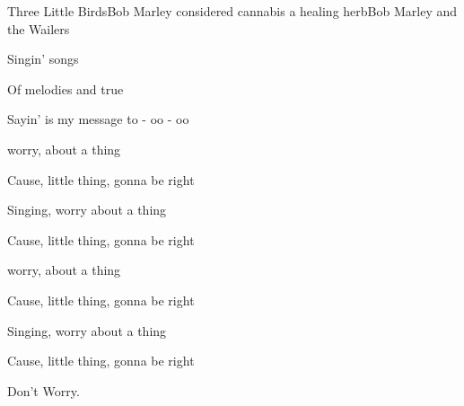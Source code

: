 \begin{SBSong}{Three Little Birds}{Bob Marley considered cannabis a healing herb}{Bob Marley and the Wailers}
\begin{SBVerse}
   Singin'  songs

   Of melodies  and true

   Sayin'  is my message to  - oo - oo
  \end{SBVerse}
  \begin{SBChorus}
    worry, about a thing

   Cause,  little thing, gonna be right

   Singing,  worry about a thing

   Cause,  little thing, gonna be right
  \end{SBChorus}
  \begin{SBChorus}
    worry, about a thing

   Cause,  little thing, gonna be right

   Singing,  worry about a thing

   Cause,  little thing, gonna be right  
   
   Don't Worry.
  \end{SBChorus}
\end{SBSong}
